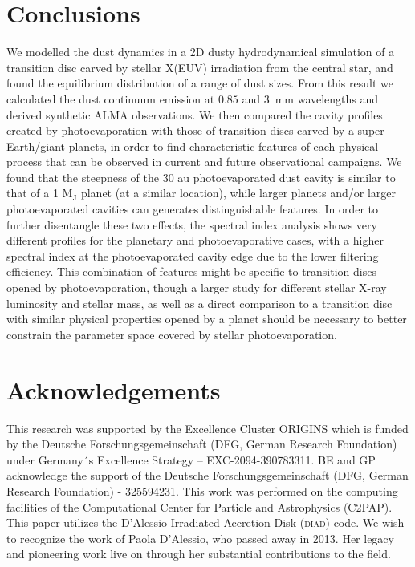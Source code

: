 \documentclass[fleqn,usenatbib]{mnras}
\begin{document}
\section{Conclusions} \label{sec:conclusions}

We modelled the dust dynamics in a 2D dusty hydrodynamical simulation of a transition disc carved by stellar X(EUV) irradiation from the central star, and found the equilibrium distribution of a range of dust sizes.
From this result we calculated the dust continuum emission at $0.85$ and \SI{3}{mm} wavelengths and derived synthetic ALMA observations. We then compared the cavity profiles created by photoevaporation with those of transition discs carved by a super-Earth/giant planets, in order to find characteristic features of each physical process that can be observed in current and future observational campaigns.
We found that the steepness of the 30 au photoevaporated dust cavity is similar to that of a 1 M$_\mathrm{J}$ planet (at a similar location), while larger planets and/or larger photoevaporated cavities can generates distinguishable features.
In order to further disentangle these two effects, the spectral index analysis shows very different profiles for the planetary and photoevaporative cases, with a higher spectral index at the photoevaporated cavity edge due to the lower filtering efficiency.
This combination of features might be specific to transition discs opened by photoevaporation, though a larger study for different stellar X-ray luminosity and stellar mass, as well as a direct comparison to a transition disc with similar physical properties opened by a planet should be necessary to better constrain the parameter space covered by stellar photoevaporation.

\section*{Acknowledgements}
This research was supported by the Excellence Cluster ORIGINS which is funded by the Deutsche Forschungsgemeinschaft (DFG, German Research Foundation) under Germany´s Excellence Strategy – EXC-2094-390783311. BE and GP acknowledge the support of the Deutsche Forschungsgemeinschaft (DFG, German Research Foundation) - 325594231.
This work was performed on the computing facilities of the Computational Center for Particle and Astrophysics (C2PAP).
This paper utilizes the D’Alessio Irradiated Accretion Disk (\textsc{diad}) code. We wish to recognize the work of Paola D’Alessio, who passed away in 2013. Her legacy and pioneering work live on through her substantial contributions to the field.
\end{document}
